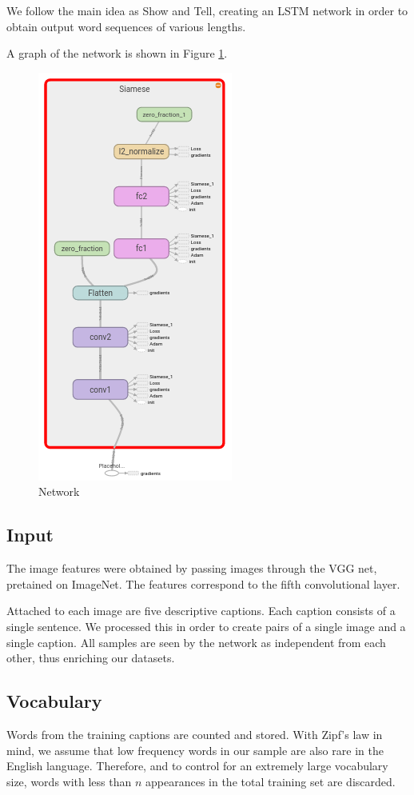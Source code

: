 \documentclass{article}
\begin{document}
We follow the main idea as Show and Tell, creating an LSTM network in order to  obtain output word sequences of various lengths. 

A graph of the network is shown in Figure \ref{fig:model}.

\begin{figure}[H]
  \centering
  \includegraphics[width=.36\linewidth]{./images/model.png}
  \caption{Network}
  \label{fig:model}
\end{figure}

\subsection{Input}
The image features were obtained by passing images through the VGG net, pretained on ImageNet. The features correspond to the fifth convolutional layer. 

Attached to each image are five descriptive captions. Each caption consists of a single sentence. We processed this in order to create pairs of a single image and a single caption. All samples are seen by the network as independent from each other, thus enriching our datasets. 


\subsection{Vocabulary}
Words from the training captions are counted and stored. With Zipf's law in mind, we assume that low frequency words in our sample are also rare in the English language. Therefore, and to control for an extremely large vocabulary size, words with less than $n$ appearances in the total training set are discarded.
\end{document}
